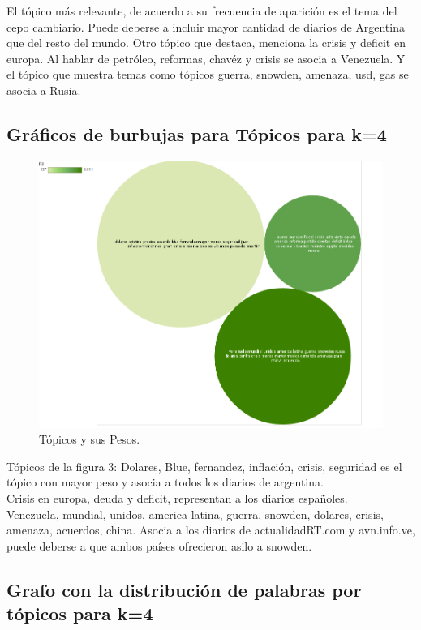\documentclass[8.5pt,twoside,twocolumn]{article}
\begin{document}
El t\'opico m\'as relevante, de acuerdo a su frecuencia de aparici\'on es el tema del cepo cambiario.  
Puede deberse a incluir mayor cantidad de diarios de Argentina que del resto del mundo.  
Otro t\'opico que destaca, menciona la crisis y deficit en europa.  
Al hablar de petr\'oleo, reformas, chav\'ez y crisis se asocia a Venezuela. 
Y el t\'opico que muestra temas como t\'opicos guerra, snowden, amenaza, usd, gas se asocia a Rusia.

\subsection{ Gr\'aficos de burbujas para T\'opicos para k=4  }
\begin{figure}[h]
  \centering
  \includegraphics[scale=0.2]{burble_k4_10_mallet_keys.png}
  \caption{T\'opicos y sus Pesos.}  
  \label{fgr:burble}
\end{figure}

T\'opicos de la figura 3:
Dolares, Blue, fernandez, inflaci\'on, crisis, seguridad es el t\'opico con mayor peso y asocia a todos los diarios de argentina.
\\
Crisis en europa, deuda y deficit, representan a los diarios espa\~noles. 
\\
Venezuela, mundial, unidos, america latina, guerra, snowden, dolares, crisis, amenaza, acuerdos, china. Asocia a los diarios de actualidadRT.com
y avn.info.ve, puede deberse a que ambos pa\'ises ofrecieron asilo a snowden.

\subsection{ Grafo con la distribuci\'on de palabras por t\'opicos para k=4  }
\end{document}
